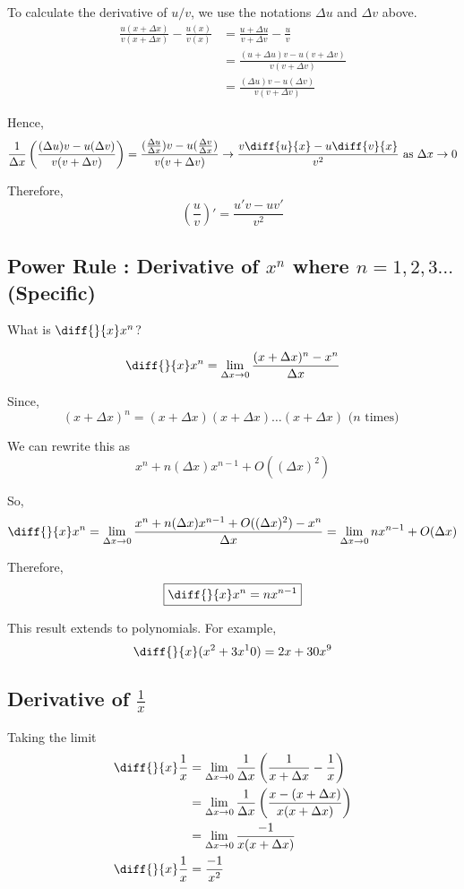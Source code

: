 To calculate the derivative of $u/v$, we use the notations $\Delta u$ and $\Delta v$ above.
\begin{equation*}
\begin{split}
	\frac{u(x+\Delta x)}{v(x+\Delta x)} - \frac{u(x)}{v(x)}
		& = \frac{u + \Delta u}{v + \Delta v} - \frac{u}{v} \\
		& = \frac{(u+\Delta u)v - u(v+\Delta v)}{v(v+\Delta v)} \\
		& = \frac{(\Delta u)v - u(\Delta v)}{v(v+\Delta v)}
\end{split}
\end{equation*}

Hence,
$$
\frac{1}{\Delta x} \left( \frac{(\Delta u)v - u(\Delta v)}{v(v+\Delta v)} \right)
	= \frac{(\frac{\Delta u}{\Delta x})v - u(\frac{\Delta v}{\Delta x})}{v(v+\Delta v)}
	\to \frac{v\diff{u}{x} - u\diff{v}{x}}{v^2} \text{ as } \Delta x \to 0
$$

Therefore, 
$$(\frac{u}{v})' = \frac{u'v - uv'}{v^2}$$



\subsection{Power Rule : Derivative of $x^n$ where $n = 1,2,3\ldots$ (Specific)}

What is $\diff{}{x} x^n$?

$$ \diff{}{x} x^n = \lim_{\Delta x \to 0} \frac{(x+\Delta x)^n - x^n}{\Delta x} $$

Since, $$ (x+\Delta x)^n = (x+\Delta x)(x+\Delta x)\ldots(x+\Delta x) \text{ ($n$ times) } $$

We can rewrite this as $$ x^n + n(\Delta x)x^{n-1} + O((\Delta x)^2) $$

So, $$ \diff{}{x} x^n = \lim_{\Delta x \to 0} \frac{x^n + n(\Delta x)x^{n-1} + O((\Delta x)^2) - x^n}{\Delta x} = \lim_{\Delta x \to 0} nx^{n-1} + O(\Delta x) $$

Therefore, $$ \boxed{ \diff{}{x} x^n = nx^{n-1} } $$

This result extends to polynomials. For example, $$ \diff{}{x}(x^2+3x^10) = 2x + 30x^9 $$

\subsection{Derivative of $\frac{1}{x}$}
Taking the limit
\begin{equation*}
\begin{split}
	\diff{}{x} \frac{1}{x} 
		& = \lim_{\Delta x \to 0} \frac{1}{\Delta x} \left( \frac{1}{x+\Delta x} - \frac{1}{x} \right) \\
		& = \lim_{\Delta x \to 0} \frac{1}{\Delta x} \left( \frac{x - (x+\Delta x)}{x(x+\Delta x)} \right) \\
		& = \lim_{\Delta x \to 0} \frac{-1}{x(x+\Delta x)} \\
	\diff{}{x} \frac{1}{x} & = \frac{-1}{x^2}
\end{split}
\end{equation*}
